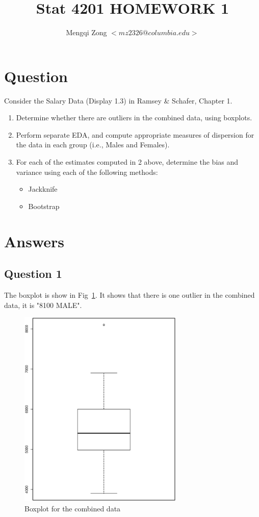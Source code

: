 \documentclass{article}
\title{Stat 4201 HOMEWORK 1}
\author{Mengqi Zong $<mz2326@columbia.edu>$}
\begin{document}
\maketitle

\section{Question}
Consider the Salary Data (Display 1.3) in Ramsey \& Schafer, Chapter 1.
\begin{enumerate}
\item Determine whether there are outliers in the combined data, using
boxplots.
\item Perform separate EDA, and compute appropriate measures of
dispersion for the data in each group (i.e., Males and Females).
\item For each of the estimates computed in 2 above, determine the bias
and variance using each of the following methods:
\begin{itemize}
\item Jackknife
\item Bootstrap
\end{itemize}
\end{enumerate}

\section{Answers}

\subsection{Question 1}
The boxplot is show in Fig~\ref{fig:box_mix}. It shows that there is one
outlier in the combined data, it is "8100 MALE".

\begin{figure}[ht!]
  \centering
  \includegraphics[width=0.7\textwidth]{boxplot_mix}
  \caption{Boxplot for the combined data \label{fig:box_mix}}
\end{figure}
\end{document}
